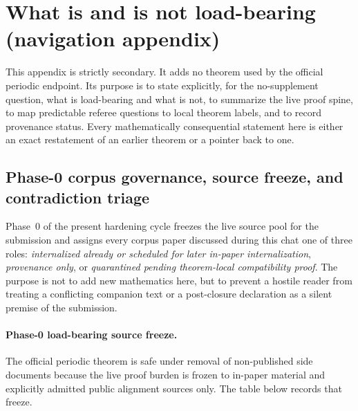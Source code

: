 \clearpage
\section{What is and is not load-bearing (navigation appendix)}\label{sec:internal-ledger}
This appendix is strictly secondary. It adds no theorem used by the official periodic endpoint. Its purpose is to state explicitly, for the no-supplement question, what is load-bearing and what is not, to summarize the live proof spine, to map predictable referee questions to local theorem labels, and to record provenance status. Every mathematically consequential statement here is either an exact restatement of an earlier theorem or a pointer back to one.

\subsection{Phase-0 corpus governance, source freeze, and contradiction triage}\label{sec:phase0-source-freeze}
Phase~0 of the present hardening cycle freezes the live source pool for the submission and assigns every corpus paper discussed during this chat one of three roles: \emph{internalized already or scheduled for later in-paper internalization}, \emph{provenance only}, or \emph{quarantined pending theorem-local compatibility proof}. The purpose is not to add new mathematics here, but to prevent a hostile reader from treating a conflicting companion text or a post-closure declaration as a silent premise of the submission.

\paragraph{Phase-0 load-bearing source freeze.}
The official periodic theorem is safe under removal of non-published side documents because the live proof burden is frozen to in-paper material and explicitly admitted public alignment sources only. The table below records that freeze.

